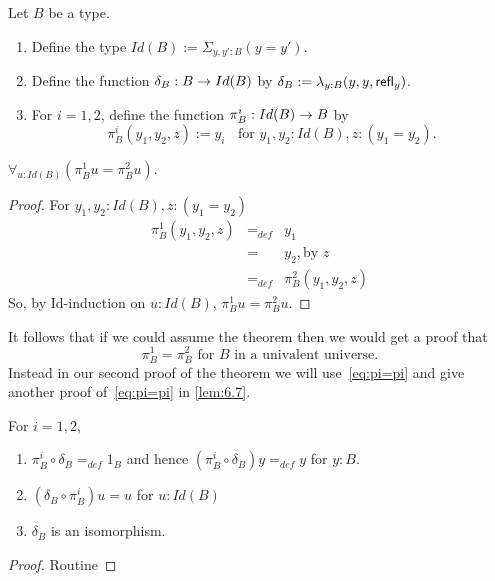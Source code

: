 \begin{defn} Let $B$ be a type.
\begin{enumerate}
\item Define the type $Id(B):=\Sigma_{y,y':B}(y=y')$.
\item Define the function $\delta_B:B\rightarrow Id(B)$ by
$\delta_B:=\lambda_{y:B}(y,y,\mathsf{refl}_{y})$.
\item For $i=1,2$, define  the function $\pi^i_B:Id(B)\rightarrow B$ by
  \[ \pi^i_B(y_1,y_2,z):= y_i\;\;\mbox{ for }y_1,y_2:Id(B), z:(y_1=y_2).\]
\end{enumerate}
\end{defn}
\begin{thm}
$\forall_{u:Id(B)}(\pi^1_Bu = \pi^2_Bu)$.
\end{thm}
\begin{proof}
For $y_1,y_2:Id(B), z:(y_1=y_2)$
  \[\begin{array}{lll}
\pi^1_B(y_1,y_2,z)&=_{def}& y_1\\
                 &=&y_2, \mbox{by } z\\
                 &=_{def}&\pi^2_B(y_1,y_2,z)
  \end{array}\]
So, by Id-induction on $u:Id(B)$, $\pi^1_Bu = \pi^2_Bu$.  
\end{proof}

It follows that if we could assume
the theorem then we would get a proof that 
\begin{equation}
  \pi^1_B = \pi^2_B\mbox{ for $B$ in a univalent universe.}\label{eq:pi=pi}
\end{equation}
Instead in our second proof of the theorem we will use~\eqref{eq:pi=pi}
and give another proof of~\eqref{eq:pi=pi} in \autoref{lem:6.7}.

\begin{lem}\label{fe:lem-delta-equiv} \label{lem:4.9}
For $i=1,2$,
\begin{enumerate}
\item $\pi^i_B\circ\delta_B =_{def} 1_B$ and hence 
$(\pi^i_B\circ\delta_B)y =_{def} y$ for $y:B$.
\item $(\delta_B\circ\pi^i_B)u = u$ for $u:Id(B)$
\item $\delta_B$ is an isomorphism.
\end{enumerate}
\end{lem}
\begin{proof} Routine
\end{proof}


